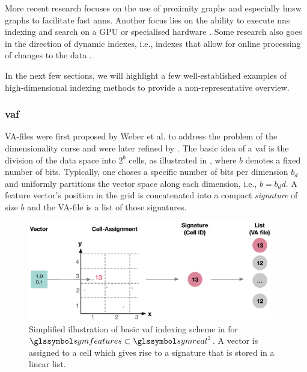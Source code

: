 More recent research focuses on the use of proximity graphs \cite{Zhao:2022Approximate} and especially \acrfull{hnsw} graphs  \cite{Malkov:2018Efficient,Chen:2021SPANN} to facilitate fast \acrshort{anns}. Another focus lies on the ability to execute \acrshort{nns} indexing and search on a GPU \cite{Johnson:2019Billion,Zhao:2020Song} or specialised hardware \cite{Lee:2022Anna}. Some research also goes in the direction of dynamic indexes, i.e., indexes that allow for online processing of changes to the data \cite{Olafsson:2011Dynamic,Zhao:2022Approximate}.

In the next few sections, we will highlight a few well-established examples of high-dimensional indexing methods to provide a non-representative overview.

\subsubsection{\acrfull{vaf}}

VA-files were first proposed by Weber et al. \cite{Weber:1998Va} to address the problem of the dimensionality curse and were later refined by \cite{Ferhatosmanoglu:2000Vector}. The basic idea of a \acrshort{vaf} is the division of the data space into $2^b$ cells, as illustrated in , where $b$ denotes a fixed number of bits. Typically, one choses a specific number of bits per dimension $b_d$ and uniformly partitions the vector space along each dimension, i.e., $b = b_dd$. A feature vector's position in the grid is concatenated into a compact \emph{signature} of size $b$ and the VA-file is a list of those signatures. 

\begin{figure}[tb]
\centering
\includegraphics[width=0.95\textwidth]{figures/vaf}
\caption{Simplified illustration of basic \acrshort{vaf} indexing scheme in for $\symfeatures \subset \symreal^2$. A vector is assigned to a cell which gives rise to a signature that is stored in a linear list.}
\label{fig:vaf}
\end{figure}

